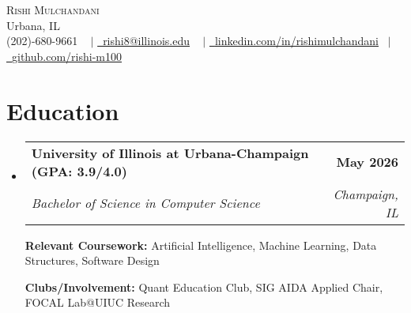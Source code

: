 \documentclass[letterpaper,11pt]{article}
\makeatletter
\newcommand{\resumeSubheading}[4]{
  \vspace{-2pt}\item
    \begin{tabular*}{1.0\textwidth}[t]{l@{\extracolsep{\fill}}r}
      \textbf{#1} & \textbf{\small #2} \\
      \textit{\small#3} & \textit{\small #4} \\
    \end{tabular*}\vspace{-7pt}
}
\newcommand{\resumeSubHeadingListStart}{\begin{itemize}[leftmargin=0.0in, label={}]}
\newcommand{\resumeSubHeadingListEnd}{\end{itemize}}
\makeatother
\begin{document}


\begin{center}
    {\Huge \scshape  Rishi Mulchandani  } \\ \vspace{1pt}
                \vspace{-1pt}
    Urbana, IL \\ \vspace{0pt}
            \vspace{0pt}
    \small \raisebox{-0.1\height} (202)-680-9661 ~ $\vert$ \href{mailto:rishi8@illinois.edu}{\raisebox{-0.2\height}\ \underline{rishi8@illinois.edu}} ~ $\vert$
        \vspace{4pt}
    \href{https://linkedin.com/in/rishimulchandani}{\raisebox{-0.2\height}\ \underline{linkedin.com/in/rishimulchandani}}  ~$\vert$
    \href{https://github.com/rishi-m100}{\raisebox{-0.2\height}\ \underline{github.com/rishi-m100}}

    \vspace{-14pt}
\end{center}


\section{Education}
  \resumeSubHeadingListStart
    \resumeSubheading
      {University of Illinois at Urbana-Champaign (GPA: 3.9/4.0)}{May 2026}
      {Bachelor of Science in Computer Science}{Champaign, IL}
          \vspace{-2pt}

    {\textbf{Relevant Coursework:}  Artificial Intelligence, Machine Learning, Data Structures, Software Design}
          \vspace{-2pt}

    {\textbf{Clubs/Involvement:} Quant Education Club, SIG AIDA Applied Chair, FOCAL Lab@UIUC Research}

  \resumeSubHeadingListEnd

\end{document}

